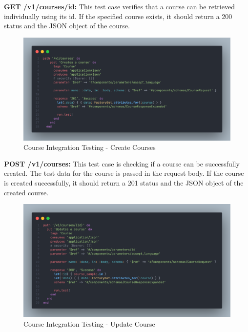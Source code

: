 \begin{justify}
\noindent \textbf{GET /v1/courses/{id}:} This test case verifies that a course can be retrieved individually using its id. If the specified course exists, it should return a 200 status and the JSON object of the course.

\begin{figure}[H]
    \centerline{\includegraphics[width=150mm,scale=1]{figures/implementation_and_testing/testing/AIT/post_v1_courses.png}}
    \caption{Course Integration Testing - Create Courses}
    \label{Course Integration Testing - Create Courses}
\end{figure}

\noindent \textbf{POST /v1/courses:} This test case is checking if a course can be successfully created. The test data for the course is passed in the request body. If the course is created successfully, it should return a 201 status and the JSON object of the created course.

\begin{figure}[H]
    \centerline{\includegraphics[width=150mm,scale=1]{figures/implementation_and_testing/testing/AIT/put_v1_course.png}}
    \caption{Course Integration Testing - Update Course}
    \label{Course Integration Testing - Update Course}
\end{figure}


\end{justify}
